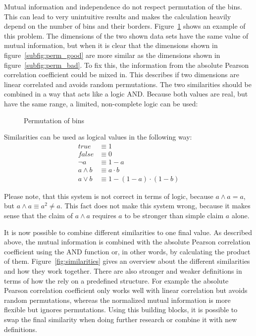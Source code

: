 Mutual information and independence do not respect permutation of the bins. This can lead to very unintuitive results and makes the calculation heavily depend on the number of bins and their borders. Figure~\ref{fig:permutation} shows an example of this problem. The dimensions of the two shown data sets have the same value of mutual information, but when it is clear that the dimensions shown in figure~\ref{subfig:perm_good} are more similar as the dimensions shown in figure~\ref{subfig:perm_bad}. To fix this, the information from the absolute Pearson correlation coefficient could be mixed in. This describes if two dimensions are linear correlated and avoids random permutations. The two similarities should be combined in a way that acts like a logic AND. Because both values are real, but have the same range, a limited, non-complete logic can be used:

\begin{figure}
	\caption{Permutation of bins}
	\label{fig:permutation}
	\centering
	\hfill
\end{figure}

\begin{envdef}
	Similarities can be used as logical values in the following way:
	\begin{align}
		true &\equiv 1\\
		false &\equiv 0\\
		\neg a &\equiv 1 - a\\
		a \wedge b &\equiv a \cdot b\\
		a \vee b &\equiv 1 - (1 - a) \cdot (1 - b)
	\end{align}
\end{envdef}

Please note, that this system is not correct in terms of logic, because $a \wedge a = a$, but $a \wedge a \equiv a^2 \neq a$. This fact does not make this system wrong, because it makes sense that the claim of $a \wedge a$ requires $a$ to be stronger than simple claim $a$ alone.

It is now possible to combine different similarities to one final value. As described above, the mutual information is combined with the absolute Pearson correlation coefficient using the AND function or, in other words, by calculating the product of them. Figure~\ref{fig:similarities} gives an overview about the different similarities and how they work together. There are also stronger and weaker definitions in terms of how the rely on a predefined structure. For example the absolute Pearson correlation coefficient only works well with linear correlation but avoids random permutations, whereas the normalized mutual information is more flexible but ignores permutations. Using this building blocks, it is possible to swap the final similarity when doing further research or combine it with new definitions.


